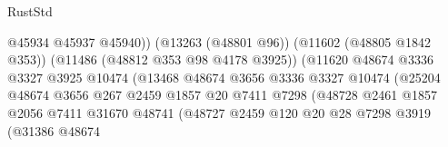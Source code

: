 \begin{lexlean}{RustStd}
\begin{coremodule}
                                                    @45934
                                                    @45937
                                                    @45940))
                                                (@13263 (@48801 @96))
                                                (@11602 (@48805 @1842 @353))
                                                (@11486 (@48812 @353 @98 @4178 @3925))
                                                (@11620
                                                  @48674
                                                  @3336
                                                  @3327
                                                  @3925
                                                  @10474
                                                  (@13468
                                                    @48674
                                                    @3656
                                                    @3336
                                                    @3327
                                                    @10474
                                                    (@25204
                                                      @48674
                                                      @3656
                                                      @267
                                                      @2459
                                                      @1857
                                                      @20
                                                      @7411
                                                      @7298
                                                      (@48728
                                                        @2461
                                                        @1857
                                                        @2056
                                                        @7411
                                                        @31670
                                                        @48741
                                                        (@48727
                                                          @2459
                                                          @120
                                                          @20
                                                          @28
                                                          @7298
                                                          @3919
                                                          (@31386
                                                            @48674

\end{coremodule}
\end{lexlean}
